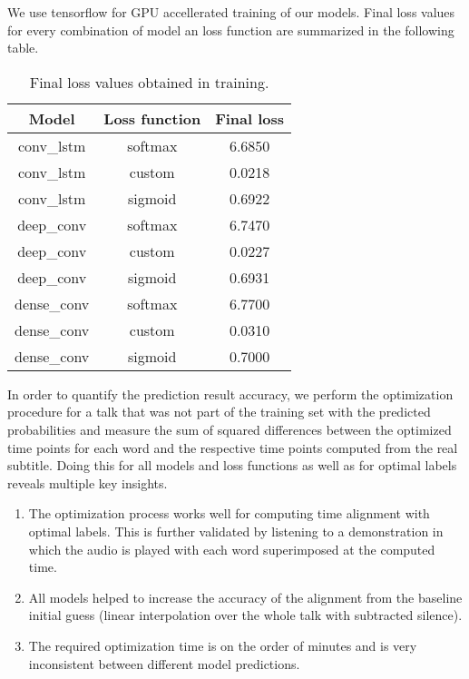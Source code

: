We use tensorflow for GPU accellerated training of our models. Final loss values for every combination of model an loss function are summarized in the following table.
\FloatBarrier
\begin{table}[ht]
	\label{tab:training_results}
	\centering
	\begin{tabular}{ccc}
		\toprule
		Model & Loss function & Final loss\\
		\midrule
		conv\_lstm  & softmax & 6.6850 \\
		conv\_lstm  & custom  & 0.0218 \\
		conv\_lstm  & sigmoid & 0.6922 \\
		deep\_conv  & softmax & 6.7470 \\
		deep\_conv  & custom  & 0.0227 \\
		deep\_conv  & sigmoid & 0.6931 \\
		dense\_conv & softmax & 6.7700 \\
		dense\_conv & custom  & 0.0310 \\
		dense\_conv & sigmoid & 0.7000 \\
		\bottomrule
	\end{tabular}
	\caption{Final loss values obtained in training.}
\end{table}
\FloatBarrier

In order to quantify the prediction result accuracy, we perform the optimization procedure for a talk that was not part of the training set with the predicted probabilities and measure the sum of squared differences between the optimized time points for each word and the respective time points computed from the real subtitle. Doing this for all models and loss functions as well as for optimal labels reveals multiple key insights.

\begin{enumerate}
	\item The optimization process works well for computing time alignment with optimal labels. This is further validated by listening to a demonstration in which the audio is played with each word superimposed at the computed time.
	\item All models helped to increase the accuracy of the alignment from the baseline initial guess (linear interpolation over the whole talk with subtracted silence).
	\item The required optimization time is on the order of minutes and is very inconsistent between different model predictions.
\end{enumerate}

